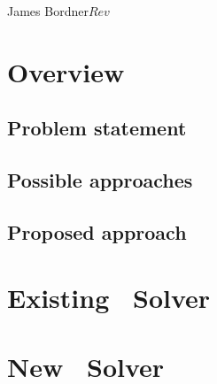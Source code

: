 \documentclass[10pt]{article}
\begin{document}
      {James Bordner}{$Rev$}


\section{Overview}

\subsection{Problem statement}

\subsection{Possible approaches}

\subsection{Proposed approach}

\section{Existing \enzo\ Solver}

\section{New \enzo\ Solver}
\end{document}

